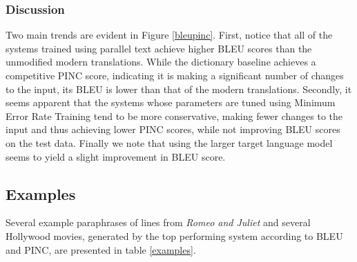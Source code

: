 \documentclass[10pt,a5paper,twoside]{article}
\begin{document}
\subsubsection{Discussion}
Two main trends are evident in Figure \ref{bleupinc}.  First, notice that all of the systems trained using parallel text achieve higher BLEU scores than the unmodified modern
translations.  While the dictionary baseline achieves a competitive PINC score, indicating it is making a significant number of changes to the 
input, its BLEU is lower than that of the modern translations.  Secondly, it seems apparent that the systems whose parameters are tuned using Minimum Error Rate Training
tend to be more conservative, making fewer changes to the input and thus achieving lower PINC scores, while not improving BLEU scores on the test data.  Finally
we note that using the larger target language model seems to yield a slight improvement in BLEU score.

\subsection{Examples}
Several example paraphrases of lines from {\em Romeo and Juliet} and several Hollywood movies, generated by the top performing system according to BLEU and PINC, are presented in table \ref{examples}.
\end{document}
